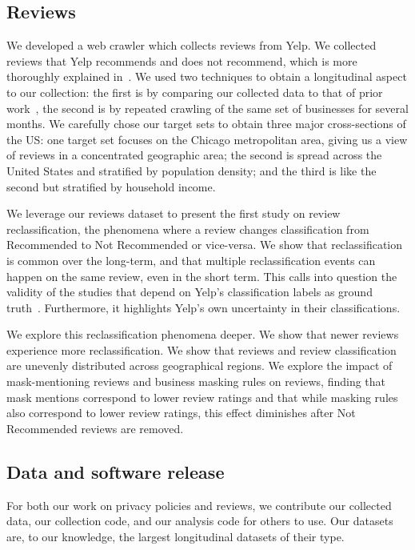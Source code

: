 \subsection{Reviews} \label{sec:intro:reviews}
We developed a web crawler which collects reviews from Yelp. We collected reviews that Yelp recommends and does not recommend, which is more thoroughly explained in~\cite{yelp2010recommendation}. We used two techniques to obtain a longitudinal aspect to our collection: the first is by comparing our collected data to that of prior work~\cite{mukherjee2013yelp}, the second is by repeated crawling of the same set of businesses for several months. We carefully chose our target sets to obtain three major cross-sections of the US: one target set focuses on the Chicago metropolitan area, giving us a view of reviews in a concentrated geographic area; the second is spread across the United States and stratified by population density; and the third is like the second but stratified by household income.

We leverage our reviews dataset to present the first study on review reclassification, the phenomena where a review changes classification from Recommended to Not Recommended or vice-versa. We show that reclassification is common over the long-term, and that multiple reclassification events can happen on the same review, even in the short term. This calls into question the validity of the studies that depend on Yelp's classification labels as ground truth~\cite{rayana2015collective,kc2016temporal,mukherjee2013yelp,zhu2021ifspard,shehnepoor2017netspam,yao2017automated}. Furthermore, it highlights Yelp's own uncertainty in their classifications.

We explore this reclassification phenomena deeper. We show that newer reviews experience more reclassification. We show that reviews and review classification are unevenly distributed across geographical regions. We explore the impact of mask-mentioning reviews and business masking rules on reviews, finding that mask mentions correspond to lower review ratings and that while masking rules also correspond to lower review ratings, this effect diminishes after Not Recommended reviews are removed.

\subsection{Data and software release} \label{sec:intro:datarelease}
For both our work on privacy policies and reviews, we contribute our collected data, our collection code, and our analysis code for others to use. Our datasets are, to our knowledge, the largest longitudinal datasets of their type.

